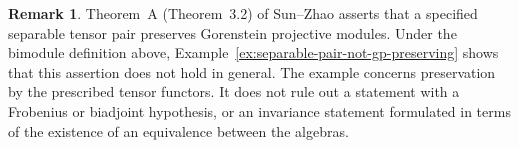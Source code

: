 \documentclass[12pt,a4paper,english,reqno]{amsart}
\numberwithin{equation}{section}
\theoremstyle{plain}
\theoremstyle{definition}
\newtheorem{remark}[theorem]{Remark}
\begin{document}
\begin{remark}
Theorem~A (Theorem~3.2) of Sun--Zhao \cite{SunZhaoSeparable2025}
asserts that a specified separable tensor pair preserves Gorenstein
projective modules. Under the bimodule definition above,
Example~\ref{ex:separable-pair-not-gp-preserving} shows that this
assertion does not hold in general. The example concerns preservation
by the prescribed tensor functors. It does not rule out a statement
with a Frobenius or biadjoint hypothesis, or an invariance statement
formulated in terms of the existence of an equivalence between the
algebras.
\end{remark}

\begingroup
\small\raggedright
\makeatletter
\renewcommand{\@biblabel}[1]{[#1]}
\makeatother
\providecommand{\bysame}{\leavevmode\hbox to3em{\hrulefill}\thinspace}
\providecommand{\MR}{\relax\ifhmode\unskip\space\fi MR }
\providecommand{\MRhref}[2]{%
  \href{http://www.ams.org/mathscinet-getitem?mr=#1}{#2}
}
\providecommand{\href}[2]{#2}
\end{document}
